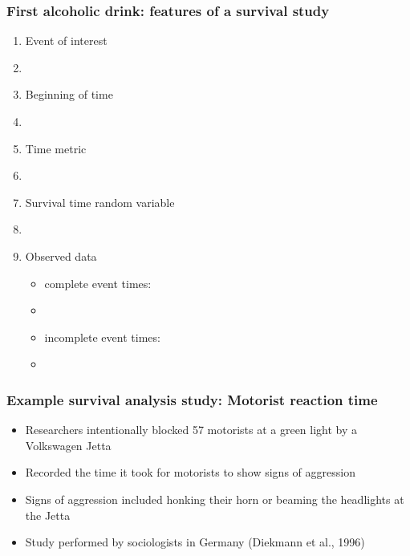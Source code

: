 \begin{frame}
\frametitle{First alcoholic drink: features of a survival study}
\begin{enumerate}
\item Event of interest %
\item[]
\item Beginning of time %
\item[]
\item Time metric %
\item[]
\item Survival time random variable %
\item[]
\item Observed data
\begin{itemize}
\item complete event times: %
\item[]
\item incomplete event times: %
\item[]
\end{itemize}
\end{enumerate}
\end{frame}


\begin{frame}
\frametitle{Example survival analysis study:  Motorist reaction time}
\begin{itemize}
\item Researchers intentionally blocked 57 motorists at a green light by a Volkswagen Jetta
\item Recorded the time it took for motorists to show signs of aggression
\item Signs of aggression included honking their horn or beaming the headlights at the Jetta
\item Study performed by sociologists in Germany (Diekmann et al., 1996)
\end{itemize}
\end{frame}

